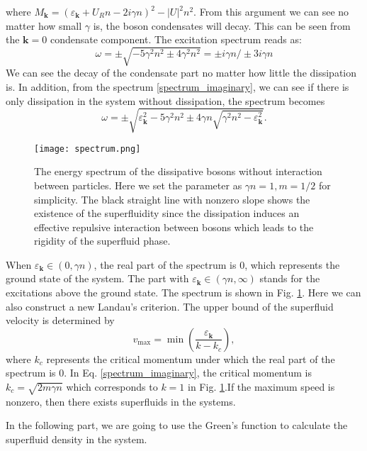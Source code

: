 \documentclass[aps,onecolumn,superscriptaddress,notitlepage,longbibliography]{revtex4-1}
\begin{document}
where $M_{\mathbf{k}} = (\varepsilon_{\mathbf{k}} + U_R n - 2 i \gamma
n)^2 - | U |^2 n^2$. From this argument we can see no matter how small
$\gamma$ is, the boson condensates will decay. This can be seen from the
$\mathbf{k}= 0$ condensate component. The excitation spectrum reads as:
\begin{equation}
  \omega = \pm \sqrt{- 5 \gamma^2 n^2 \pm 4 \gamma^2 n^2} = \pm i \gamma n /
  \pm 3 i \gamma n
\end{equation}
We can see the decay of the condensate part no matter how little the
dissipation is. In addition, from the spectrum \eqref{spectrum_imaginary}, we can see if there is only dissipation in the system without dissipation, the spectrum becomes
\begin{equation}
  \omega = \pm \sqrt{\varepsilon_{\mathbf{k}}^2 - 5 \gamma^2 n^2 \pm 4 \gamma n \sqrt{\gamma^2 n^2 -
  \varepsilon_{\mathbf{k}}^2}}.
\end{equation}
\begin{figure}
  \centering
  \texttt{[image: spectrum.png]}
  \caption{The energy spectrum of the dissipative bosons without interaction between particles. Here we set the parameter as $\gamma n=1,m=1/2$ for simplicity. The black straight line with nonzero slope shows the existence of the superfluidity since the dissipation induces an effective repulsive interaction between bosons which leads to the rigidity of the superfluid phase.}
  \label{fig: spectrum}
\end{figure}
When $\varepsilon_{\mathbf{k}}\in(0,\gamma n)$, the real part of the spectrum is $0$, which represents the ground state of the system. The part with $\varepsilon_{\mathbf{k}}\in(\gamma n,\infty)$ stands for the excitations above the ground state. The spectrum is shown in Fig. \ref{fig: spectrum}. Here we can also construct a new Landau's criterion. The upper bound of the superfluid velocity is determined by
\begin{equation}
  v_{\max}=\min(\frac{\varepsilon_{\mathbf{k}}}{k-k_c}),
\end{equation}
where $k_c$ represents the critical momentum under which the real part of the spectrum is $0$. In Eq. \eqref{spectrum_imaginary}, the critical momentum is $k_c=\sqrt{2m\gamma n}$ which corresponds to $k=1$ in Fig. \ref{fig: spectrum}.If the maximum speed is nonzero, then there exists superfluids in the systems.

In the following part, we are going to use the Green's
function to calculate the superfluid density in the system. 
\end{document}
